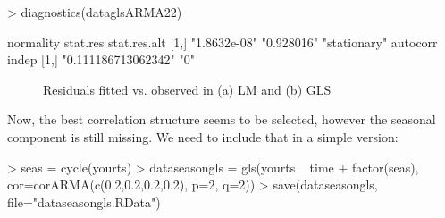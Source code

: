 \documentclass[10pt, a4paper]{article} %
\begin{document}
\begin{Schunk}
\begin{Sinput}
> diagnostics(dataglsARMA22)
\end{Sinput}
\begin{Soutput}
     normality    stat.res   stat.res.alt
[1,] "1.8632e-08" "0.928016" "stationary"
     autocorr            indep
[1,] "0.111186713062342" "0"  
\end{Soutput}
\end{Schunk}



\begin{figure}[ht]
\begin{center}
\qquad
{}
\end{center}
\caption{Residuals fitted vs. observed in (a) LM and (b) GLS}
\label{residual}
\end{figure}

\noindent Now, the best correlation structure seems to be selected, however the seasonal component is still missing. We need to include that in a simple version: 


\begin{Schunk}
\begin{Sinput}
> seas = cycle(yourts)
> dataseasongls = gls(yourts ~ time + factor(seas),
                     cor=corARMA(c(0.2,0.2,0.2,0.2),
                                 p=2, q=2))
> save(dataseasongls, file="dataseasongls.RData")
\end{Sinput}
\end{Schunk}
\end{document}
